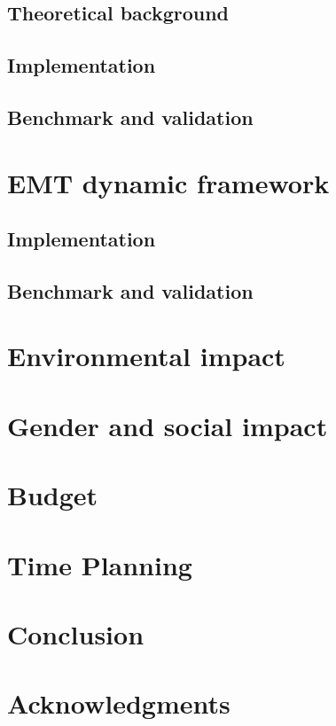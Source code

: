 \documentclass[a4paper, 11pt, titlepage, twoside]{article}
\begin{document}
\subsection{Theoretical background}

\subsection{Implementation}
 \label{2_2ImplementationSmall}
\subsection{Benchmark and validation}

\newpage

\section{EMT dynamic framework}\label{EMT}

\newpage
\subsection{Implementation}

\newpage
\subsection{Benchmark and validation}

\newpage

\cleardoublepage
\section{Environmental impact}\label{environment}

\section{Gender and social impact}\label{Gender}

\newpage

\section{Budget}\label{Budget}

\newpage
\section{Time Planning}\label{TimePlanning}


\newpage
\section{Conclusion}\label{Conclusion}

\newpage

\section*{Acknowledgments}\label{acknow} 


\appendix
\cleardoublepage

\cleardoublepage
\printbibliography
\end{document}
